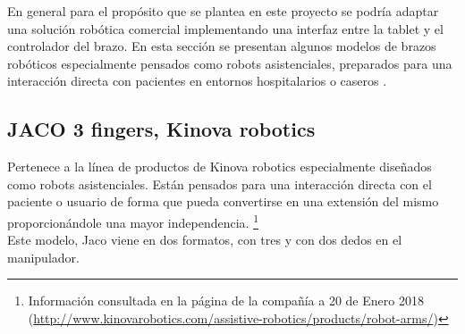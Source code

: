 	En general para el propósito que se plantea en este proyecto se podría adaptar una solución robótica comercial implementando una interfaz entre la tablet y el controlador del brazo. En esta sección se presentan algunos modelos de brazos robóticos especialmente pensados como robots asistenciales, preparados para una interacción directa con pacientes en entornos hospitalarios o caseros .
	
 \subsection{JACO 3 fingers, Kinova robotics}
	 Pertenece a la línea de productos de Kinova robotics especialmente diseñados como robots asistenciales. Están pensados para una interacción directa con el paciente o usuario de forma que pueda convertirse en una extensión del mismo proporcionándole una mayor independencia. \footnote{ Información consultada en la página de la compañía a 20 de Enero 2018 (\url{http://www.kinovarobotics.com/assistive-robotics/products/robot-arms/})}
	 \\ 
	 
	 Este modelo, Jaco viene en dos formatos, con tres y con dos dedos en el manipulador. 
	  
